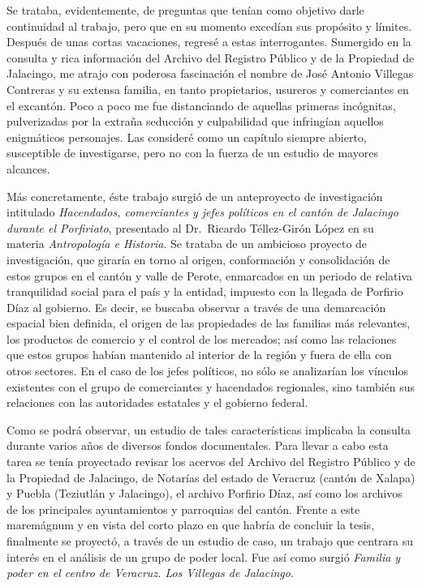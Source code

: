 \documentclass[14pt,twoside,final]{extbook} %
\begin{document}
Se trataba, evidentemente, de preguntas que tenían como objetivo darle continuidad al trabajo, pero que en su momento excedían sus propósito y límites. Después de unas cortas vacaciones, regresé a estas interrogantes. Sumergido en la consulta y rica información del Archivo del Registro Público y de la Propiedad de Jalacingo, me atrajo con poderosa fascinación el nombre de José Antonio Villegas Contreras y su extensa familia, en tanto propietarios, usureros y comerciantes en el excantón. Poco a poco me fue distanciando de aquellas primeras incógnitas, pulverizadas por la extraña seducción y culpabilidad que infringían aquellos enigmáticos personajes. Las consideré como un capítulo siempre abierto, susceptible de investigarse, pero no con la fuerza de un estudio de mayores alcances.

Más concretamente, éste trabajo surgió de un anteproyecto de investigación intitulado \emph{Hacendados, comerciantes y jefes políticos en el cantón de Jalacingo durante el Porfiriato}, presentado al Dr.~Ricardo Téllez-Girón López en su materia \emph{Antropología e Historia}. Se trataba de un ambicioso proyecto de investigación, que giraría en torno al origen, conformación y consolidación de estos grupos en el cantón y valle de Perote, enmarcados en un periodo de relativa tranquilidad social para el país y la entidad, impuesto con la llegada de Porfirio Díaz al gobierno. Es decir, se buscaba observar a través de una demarcación espacial bien definida, el origen de las propiedades de las familias más relevantes, los productos de comercio y el control de los mercados; así como las relaciones que estos grupos habían mantenido al interior de la región y fuera de ella con otros sectores. En el caso de los jefes políticos, no sólo se analizarían los vínculos existentes con el grupo de comerciantes y hacendados regionales, sino también sus relaciones con las autoridades estatales y el gobierno federal.

Como se podrá observar, un estudio de tales características implicaba la consulta durante varios años de diversos fondos documentales. Para llevar a cabo esta tarea se tenía proyectado revisar los acervos del Archivo del Registro Público y de la Propiedad de Jalacingo, de Notarías del estado de Veracruz (cantón de Xalapa) y Puebla (Teziutlán y Jalacingo), el archivo Porfirio Díaz, así como los archivos de los principales ayuntamientos y parroquias del cantón. Frente a este maremágnum y en vista del corto plazo en que habría de concluir la tesis, finalmente se proyectó, a través de un estudio de caso, un trabajo que centrara su interés en el análisis de un grupo de poder local. Fue así como surgió \emph{Familia y poder en el centro de Veracruz. Los Villegas de Jalacingo}.
\end{document}
